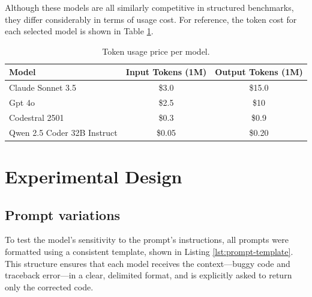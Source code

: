 


Although these models are all similarly competitive in structured benchmarks, they differ considerably in terms of usage cost. For reference, the token cost for each selected model is shown in Table \ref{tab:model-tokens}.
\begin{table}[h!]
\centering
\caption{Token usage price per model.}
\label{tab:model-tokens}
\begin{tabular}{|l|c|c|}
\hline
\textbf{Model} & \textbf{Input Tokens (1M)} & \textbf{Output Tokens (1M)} \\ \hline
Claude Sonnet 3.5 & \$3.0 & \$15.0 \\ \hline
Gpt 4o & \$2.5 & \$10 \\ \hline
Codestral 2501 & \$0.3 & \$0.9 \\ \hline
Qwen 2.5 Coder 32B Instruct & \$0.05 & \$0.20 \\ \hline
\end{tabular}
\end{table}


\section{Experimental Design}
\subsection{Prompt variations}

To test the model's sensitivity to the prompt's instructions, all prompts were formatted 
using a consistent template, shown in Listing \ref{lst:prompt-template}. This structure ensures 
that each model receives the context—buggy code and traceback error—in a clear, delimited 
format, and is explicitly asked to return only the corrected code.

